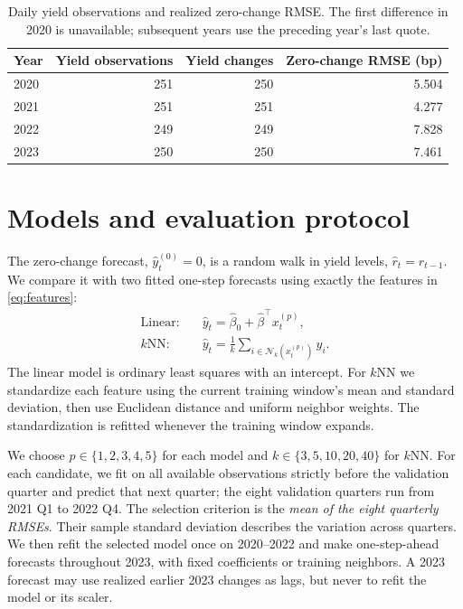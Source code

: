 \documentclass[10pt,letterpaper]{article}
\begin{document}
\begin{table}[H]
\centering
\caption{Daily yield observations and realized zero-change RMSE. The first difference in 2020 is unavailable; subsequent years use the preceding year's last quote.}
\label{tab:data}
\begin{tabular}{lrrr}
\toprule
Year & Yield observations & Yield changes & Zero-change RMSE (bp)\\
\midrule
2020 & 251 & 250 & 5.504\\
2021 & 251 & 251 & 4.277\\
2022 & 249 & 249 & 7.828\\
2023 & 250 & 250 & 7.461\\
\bottomrule
\end{tabular}
\end{table}

\section{Models and evaluation protocol}
The zero-change forecast, $\widehat y_t^{(0)}=0$, is a random walk in yield levels, $\widehat r_t=r_{t-1}$. We compare it with two fitted one-step forecasts using exactly the features in \eqref{eq:features}:
\begin{align}
\text{Linear:}\quad &\widehat y_t=\widehat\beta_0+\widehat\beta^\top x_t^{(p)},\\
\text{$k$NN:}\quad &\widehat y_t=\frac1k\sum_{i\in\mathcal N_k(x_t^{(p)})}y_i.
\end{align}
The linear model is ordinary least squares with an intercept. For $k$NN we standardize each feature using the current training window's mean and standard deviation, then use Euclidean distance and uniform neighbor weights. The standardization is refitted whenever the training window expands.

We choose $p\in\{1,2,3,4,5\}$ for each model and $k\in\{3,5,10,20,40\}$ for $k$NN. For each candidate, we fit on all available observations strictly before the validation quarter and predict that next quarter; the eight validation quarters run from 2021 Q1 to 2022 Q4. The selection criterion is the \emph{mean of the eight quarterly RMSEs}. Their sample standard deviation describes the variation across quarters. We then refit the selected model once on 2020--2022 and make one-step-ahead forecasts throughout 2023, with fixed coefficients or training neighbors. A 2023 forecast may use realized earlier 2023 changes as lags, but never to refit the model or its scaler.
\end{document}
